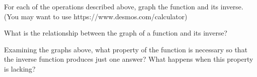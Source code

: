 \documentclass[number]{ximera}
\begin{document}
\begin{question}
For each of the operations described above, graph the function and its inverse. (You may want to use https://www.desmos.com/calculator)

What is the relationship between the graph of a function and its inverse?
\begin{freeResponse}

\end{freeResponse}

\end{question}

\begin{question}
Examining the graphs above, what property of the function is necessary so that the inverse function produces just one answer? What happens when this property is lacking?
\begin{freeResponse}

\end{freeResponse}

\end{question}
\end{document}
